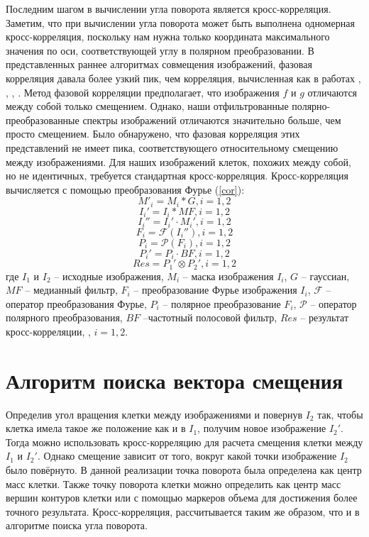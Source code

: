 \documentclass[oneside,final,14pt]{extreport}
\begin{document}
Последним шагом в вычислении угла поворота является кросс-корреляция. Заметим, что при вычислении угла поворота может быть выполнена одномерная кросс-корреляция, поскольку нам нужна только координата максимального значения по оси, соответствующей углу в полярном преобразовании. В представленных раннее алгоритмах совмещения изображений, фазовая корреляция давала более узкий пик, чем корреляция, вычисленная как в работах \cite{sheng1986experiments}, \cite{erturk2003translation}, \cite{de1987registration}, \cite{lee1993principles}. Метод фазовой корреляции предполагает, что изображения \(f\) и \(g\) отличаются между собой только смещением. Однако, наши отфильтрованные  полярно-преобразованные спектры изображений отличаются значительно больше, чем просто смещением. Было обнаружено, что фазовая корреляция этих представлений не  имеет пика, соответствующего относительному смещению между изображениями. Для наших изображений клеток, похожих между собой, но не идентичных, требуется стандартная кросс-корреляция.
Кросс-корреляция вычисляется с помощью преобразования Фурье (\ref{cor}):
\[ M'_i = M_i * G, i = 1,2\] \[I_i' = I_i * MF, i = 1,2\]
\[I_i'' = I_i' \cdot M_i', i = 1,2\] \[ F_i = \mathcal F(I_i''), i = 1,2\] \[P_i = \mathcal P(F_i), i = 1,2\]
\[P_i' = P_i \cdot BF, i = 1,2\]
\[Res = P_1' \otimes P_2', i = 1,2\]
где \(I_1\) и \(I_2\) -- исходные изображения, \(M_i\) -- маска изображения \(I_i\), \(G\) -- гауссиан, \(MF\) -- медианный фильтр, \(F_i\) -- преобразование Фурье изображения \(I_i\), \(\mathcal F\) -- оператор преобразования Фурье, \(P_i\) -- полярное преобразование \(F_i\), \(\mathcal P\) -- оператор полярного преобразования, \(BF\) --частотный полосовой фильтр, \(Res\) -- результат кросс-корреляции, , \(i = 1,2\).

\section{Алгоритм поиска вектора смещения}
Определив угол вращения клетки между изображениями и повернув \(I_2\) так, чтобы клетка  имела такое же положение как и в \(I_1\), получим новое изображение \(I_2'\). Тогда можно использовать кросс-корреляцию для расчета смещения клетки между \(I_1\) и \(I_2'\).
Однако смещение зависит от того, вокруг какой точки изображение \(I_2\) было повёрнуто. В данной реализации точка поворота была определена как центр масс клетки. Также точку поворота клетки можно определить как центр масс вершин контуров клетки или с помощью маркеров объема для достижения более точного результата.
Кросс-корреляция, рассчитывается таким же образом, что и в алгоритме поиска угла поворота.
\end{document}
